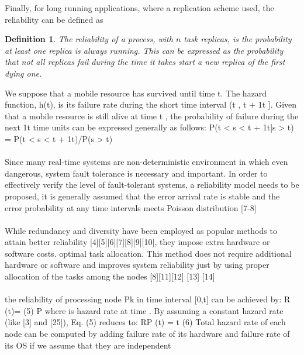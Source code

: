 \documentclass{cslthse-msc}
\newtheorem{definition}{Definition}[chapter]
\begin{document}
Finally, for long running applications, where a replication scheme used, the reliability can be defined as
\begin{definition} \label{def:task_replica_reliability}
The reliability of a process, with $n$ task replicas, is the probability at least one replica is always running. This can be expressed as the probability that not all replicas fail during the time it takes start a new replica of the first dying one.
\end{definition}

\newpage
We suppose that a mobile resource has survived until time t. The hazard function, h(t), is its failure rate during the short time interval (t , t + 1t ]. Given that a mobile resource is still alive at time t , the probability of failure during the next 1t time units can be expressed generally as follows:
P(t < s < t + 1t|s > t) = P(t < s < t + 1t)/P(s > t) \cite{effTaskReplMobGrid}
\\\\
Since many real-time systems are non-deterministic environment in which even dangerous, system fault tolerance is necessary and important. In order to effectively verify the level of fault-tolerant systems, a reliability model needs to be proposed, it is generally assumed that the error arrival rate is stable and the error probability at any time intervals meets Poisson distribution [7-8] \cite{realTimeSchedAlgo}
\\\\
While redundancy and diversity have been employed as popular methods to attain better reliability [4][5][6][7][8][9][10], they impose extra hardware or software costs.
optimal task allocation. This method does not require additional hardware or software and improves system reliability just by using proper allocation of the tasks among the nodes [8][11][12] [13] [14] \cite{optTaskAllocationForMaxRel}
\\\\
the reliability of processing node Pk in
time interval [0,t] can be achieved by:
R (t)=            (5) P 
where       is hazard rate at time  . By assuming a constant hazard rate (like [3] and [25]), Eq. (5) reduces to:
RP (t) =       t (6) Total hazard rate of each node can be computed by adding failure rate of its hardware and failure rate of its OS if we assume that they are independent 
\\\\
\cite{discContRelModel}
\\\\
\end{document}

